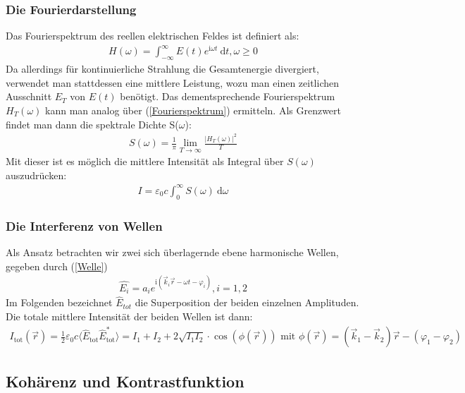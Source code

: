 \documentclass[german,  %
parskip=full,  %
]{scrartcl}
\begin{document}
\subsubsection{Die Fourierdarstellung}
Das Fourierspektrum des reellen elektrischen Feldes ist definiert als:
\begin{align}
\label{Fourierspektrum} H(\omega) = \int_{- \infty}^{\infty}  E(t) e^{\mathrm{i}\omega t}  \ \mathrm{d}t, \omega \geq 0
\end{align}
Da allerdings für kontinuierliche Strahlung die Gesamtenergie divergiert, verwendet man stattdessen eine mittlere Leistung, wozu man einen zeitlichen Ausschnitt $E_T$ von $E(t)$ benötigt. Das dementsprechende Fourierspektrum $H_T(\omega)$ kann man analog über (\ref{Fourierspektrum}) ermitteln. Als Grenzwert findet man dann die spektrale Dichte S($\omega$):
\begin{align}
\label{SpektraleDichte} S(\omega)= \frac{1}{\pi} \lim\limits_{T \rightarrow \infty} \frac{|H_T(\omega)|^2}{T}
\end{align}
Mit dieser ist es möglich die mittlere Intensität als Integral über $S(\omega)$ auszudrücken:
\begin{align}
\label{Intensität3} I=\varepsilon_0 c \int_{0}^{\infty} S(\omega) \ \mathrm{d} \omega
\end{align}

\subsubsection{Die Interferenz von Wellen}
Als Ansatz betrachten wir zwei sich überlagernde ebene harmonische Wellen, gegeben durch (\ref{Welle})
\begin{align}
\label{Welle} \hat{E_i}=a_i e^{\mathrm{i}(\vec{k}_i \vec{r} - \omega t - \varphi_i)}, i=1,2
\end{align}
Im Folgenden bezeichnet $\hat{E}_{tot}$ die Superposition der beiden einzelnen Amplituden.
Die totale mittlere Intensität der beiden Wellen ist dann:
\begin{align}
\label{Intensität4} I_{\mathrm{tot}}(\vec{r})=\frac{1}{2} \varepsilon_0 c \langle \hat{E}_{\mathrm{tot}} \hat{E}_{\mathrm{tot}}^* \rangle = 
I_1 + I_2 + 2\sqrt{I_1 I_2}\cdot \cos(\phi(\vec{r})) \,\,\text{mit}\,\, \phi(\vec{r}) = (\vec{k}_1 - \vec{k}_2) \vec{r} - (\varphi_1 - \varphi_2)
\end{align}

\subsection{Kohärenz und Kontrastfunktion}
\end{document}
